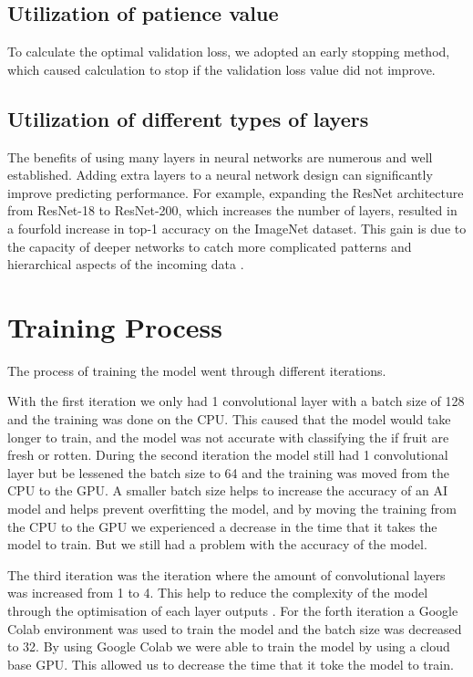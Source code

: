 \documentclass[conference]{IEEEtran}
\begin{document}
\subsection{Utilization of patience value}
To calculate the optimal validation loss, we adopted an early stopping method, which caused calculation to stop if the validation loss value did not
improve.
\subsection{Utilization of different types of layers}
The benefits of using many layers in  neural networks are numerous and well established. Adding extra layers to a neural network design can significantly improve predicting performance. For example, expanding the ResNet architecture from ResNet-18 to ResNet-200, which increases the number of layers, resulted in a fourfold increase in top-1 accuracy on the ImageNet dataset. This gain is due to the capacity of deeper networks to catch more complicated patterns and hierarchical aspects of the incoming data \cite{b9}.

\section{Training Process}

The process of training the model went through different iterations.

With the first iteration we only had 1 convolutional layer with a batch size of 128 and the training was done on the CPU. This caused that the model would take longer to train, and the model was not accurate with classifying the if fruit are fresh or rotten. During the second iteration the model still had 1 convolutional layer but be lessened the batch size to 64 and the training was moved from the CPU to the GPU. A smaller batch size helps to increase the accuracy of an AI model \cite{b2} and helps prevent overfitting the model, and by moving the training from the CPU to the GPU we experienced a decrease in the time that it takes the model to train. But we still had a problem with the accuracy of the model.

The third iteration was the iteration where the amount of convolutional layers was increased from 1 to 4. This help to reduce the complexity of the model through the optimisation of each layer outputs \cite{b3}. For the forth iteration a Google Colab environment was used to train the model and the batch size was decreased to 32. By using Google Colab we were able to train the model by using a cloud base GPU. This allowed us to decrease the time that it toke the model to train.
\end{document}

